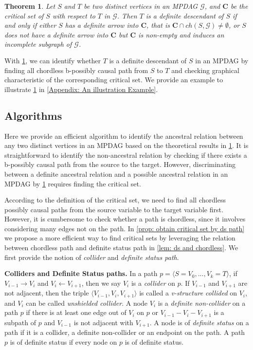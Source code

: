 \documentclass{article}
\newtheorem{theorem}{Theorem}[section]
\begin{document}
\begin{theorem}\label{theo}
    Let $S$ and $T$ be two distinct vertices in an MPDAG $\mathcal G$, and $\mathbf{C}$ be the critical set of $S$ with respect to $T$ in $\mathcal G$. Then $T$ is a definite descendant of $S$ if and only if either $S$ has a definite arrow into $\mathbf{C}$, that is $\mathbf{C} \cap{ch(S, \mathcal G)} \ne \emptyset$, or $S$ does not have a definite arrow into $\mathbf{C}$ but $\mathbf{C}$ is non-empty and induces an incomplete subgraph of $\mathcal{G}$.
\end{theorem}
 With \cref{theo}, we can identify whether $T$ is a definite descendant of $S$ in an MPDAG by finding all chordless b-possibly causal path from $S$ to $T$ and checking graphical characteristic of the corresponding critical set. We provide an example to illustrate \cref{theo} in \cref{Appendix: An illustration Example}.




\subsection{Algorithms} \label{sec: Algorithms}
Here we provide an efficient algorithm to identify the ancestral relation between any two distinct vertices in an MPDAG based on the theoretical results in \cref{theo}. It is straightforward to identify the non-ancestral relation by checking if there exists a b-possibly causal path from the source to the target. However, discriminating between a definite ancestral relation and a possible ancestral relation in an MPDAG by \cref{theo} requires finding the critical set. 

According to the definition of the critical set, we need to find all chordless possibly causal paths from the source variable to the target variable first. However, it is cumbersome to check whether a path is chordless, since it involves considering many edges not on the path. In \cref{prop: obtain critical set by ds path} we propose a more efficient way to find critical sets by leveraging the relation between chordless path and definite status path in \cref{lem: ds and chordless}. We first provide the notion of \textit{collider} and \textit{definite status path}.

\textbf{Colliders and Definite Status paths.}
In a path $p=\langle S=V_{0},..., V_{k}=T\rangle $, if $V_{i-1} \rightarrow V_{i}$ and $V_{i} \leftarrow V_{i+1}$, then we say $V_{i}$ is a \textit{collider} on $p$. If $V_{i-1}$ and $V_{i+1}$ are not adjacent, then the triple $\langle V_{i-1}, V_{i}, V_{i+1}\rangle $ is called a \textit{v-structure collided} on $V_{i}$, and $V_{i}$ can be called \textit{unshielded collider}. A node $V_{i}$ is a \textit{definite non-collider} on a path $p$ if there is at least one edge out of $V_{i}$ on $p$ or $V_{i-1} - V_{i} - V_{i+1}$ is a subpath of $p$ and $V_{i-1}$ is not adjacent with $V_{i+1}$. A node is of \textit{definite status} on a path if it is a collider, a definite non-collider or an endpoint on the path. A path $p$ is of definite status if every node on $p$ is of definite status.
\end{document}
